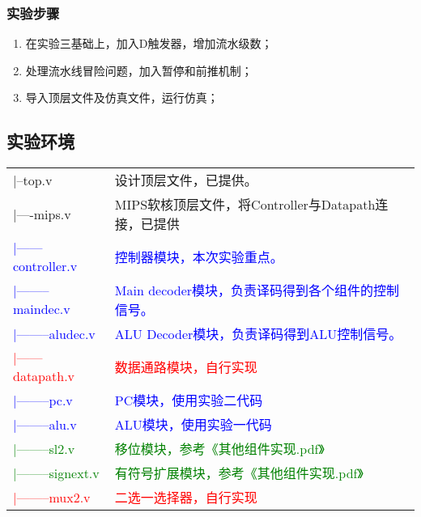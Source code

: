 \subsubsection{实验步骤}
\begin{enumerate}
    \item 在实验三基础上，加入D触发器，增加流水级数；
    \item 处理流水线冒险问题，加入暂停和前推机制；
    \item 导入顶层文件及仿真文件，运行仿真； 
\end{enumerate}

\subsection{实验环境}
\begin{table}[htbp]
    \centering
    \begin{tabu}{|l|l|}
        \hline
        |--top.v& 设计顶层文件，已提供。 \\
        |----mips.v & MIPS软核顶层文件，将Controller与Datapath连接，已提供 \\
        \textcolor{blue}{|------controller.v} &\textcolor{blue}{ 控制器模块，本次实验重点。} \\
        \textcolor{blue}{|--------maindec.v} & \textcolor{blue}{Main decoder模块，负责译码得到各个组件的控制信号。} \\
        \textcolor{blue}{|--------aludec.v} & \textcolor{blue}{ALU Decoder模块，负责译码得到ALU控制信号。}\\
        \textcolor{red}{|------datapath.v}& \textcolor{red}{数据通路模块，自行实现} \\
        \textcolor{blue}{|--------pc.v} & \textcolor{blue}{PC模块，使用实验二代码} \\
        \textcolor{blue}{|--------alu.v} & \textcolor{blue}{ALU模块，使用实验一代码} \\
        \textcolor{green}{|--------sl2.v} & \textcolor{green}{移位模块，参考《其他组件实现.pdf》} \\
        \textcolor{green}{|--------signext.v} & \textcolor{green}{有符号扩展模块，参考《其他组件实现.pdf》} \\
        \textcolor{red}{|--------mux2.v} & \textcolor{red}{二选一选择器，自行实现} \\

\end{tabu}
\end{table}
